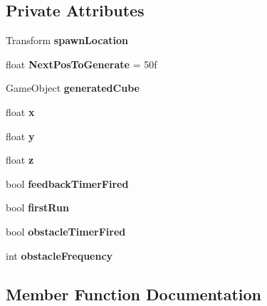 \subsection*{Private Attributes}
\begin{DoxyCompactItemize}
\item 
\mbox{\label{class_spawn_obstacle_a099de80125a16c570bcf51ed802187ee}} 
Transform {\bfseries spawn\+Location}
\item 
\mbox{\label{class_spawn_obstacle_ac1138935dca16e4d69e494971021caa6}} 
float {\bfseries Next\+Pos\+To\+Generate} = 50f
\item 
\mbox{\label{class_spawn_obstacle_a79990f95054a37c580ac35e6b0155644}} 
Game\+Object {\bfseries generated\+Cube}
\item 
\mbox{\label{class_spawn_obstacle_ab9168bcf16ada31f86469036861ac25f}} 
float {\bfseries x}
\item 
\mbox{\label{class_spawn_obstacle_a30ffdb0a2d1cd2c66e2e07cfae790223}} 
float {\bfseries y}
\item 
\mbox{\label{class_spawn_obstacle_a25054077fb908a632836163b2e0ea82c}} 
float {\bfseries z}
\item 
\mbox{\label{class_spawn_obstacle_a0ae32e6fb5e6851e19f967b57fd344bc}} 
bool {\bfseries feedback\+Timer\+Fired}
\item 
\mbox{\label{class_spawn_obstacle_ad5578345ba89f373fa09372355dffe05}} 
bool {\bfseries first\+Run}
\item 
\mbox{\label{class_spawn_obstacle_a9a66a1a4931d9cec08ce8a41bd572061}} 
bool {\bfseries obstacle\+Timer\+Fired}
\item 
\mbox{\label{class_spawn_obstacle_a4f76843c486ddc1baa730fdf80e14480}} 
int {\bfseries obstacle\+Frequency}
\end{DoxyCompactItemize}


\subsection{Member Function Documentation}
\mbox{\label{class_spawn_obstacle_ab2292dd85546b40f5c9e7c2cbf8e5198}} 
